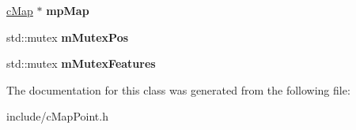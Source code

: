 \begin{DoxyCompactItemize}
\item 
\hyperlink{classMultiColSLAM_1_1cMap}{c\+Map} $\ast$ {\bfseries mp\+Map}\hypertarget{classMultiColSLAM_1_1cMapPoint_ac9c0c48ce6171c75335c80552e7f8b85}{}\label{classMultiColSLAM_1_1cMapPoint_ac9c0c48ce6171c75335c80552e7f8b85}

\item 
std\+::mutex {\bfseries m\+Mutex\+Pos}\hypertarget{classMultiColSLAM_1_1cMapPoint_afe0f24da04e47271be92300d2ae43f42}{}\label{classMultiColSLAM_1_1cMapPoint_afe0f24da04e47271be92300d2ae43f42}

\item 
std\+::mutex {\bfseries m\+Mutex\+Features}\hypertarget{classMultiColSLAM_1_1cMapPoint_a551dd797d0cd78a6b9a8ac02a6d1bf4a}{}\label{classMultiColSLAM_1_1cMapPoint_a551dd797d0cd78a6b9a8ac02a6d1bf4a}

\end{DoxyCompactItemize}


The documentation for this class was generated from the following file\+:\begin{DoxyCompactItemize}
\item 
include/c\+Map\+Point.\+h\end{DoxyCompactItemize}
